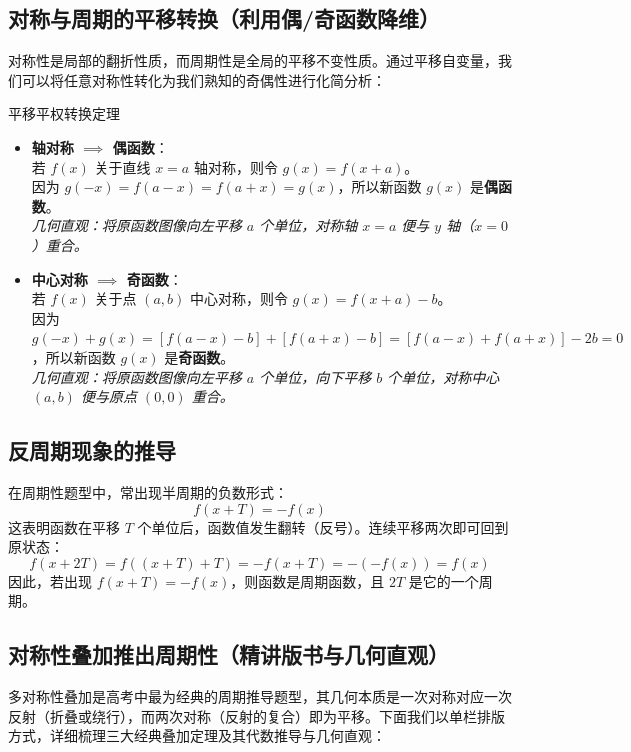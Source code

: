 \documentclass[11pt,a4paper]{ctexart}
\begin{document}
\subsection{对称与周期的平移转换（利用偶/奇函数降维）}

对称性是局部的翻折性质，而周期性是全局的平移不变性质。通过平移自变量，我们可以将任意对称性转化为我们熟知的奇偶性进行化简分析：

\begin{theorembox}{平移平权转换定理}
  \begin{itemize}
    \item \textbf{轴对称 $\implies$ 偶函数}：\\
          若 $f(x)$ 关于直线 $x = a$ 轴对称，则令 $g(x) = f(x+a)$。\\
          因为 $g(-x) = f(a-x) = f(a+x) = g(x)$，所以新函数 $g(x)$ 是\textbf{偶函数}。\\
          \textit{几何直观：将原函数图像向左平移 $a$ 个单位，对称轴 $x=a$ 便与 $y$ 轴（$x=0$）重合。}
    \item \textbf{中心对称 $\implies$ 奇函数}：\\
          若 $f(x)$ 关于点 $(a, b)$ 中心对称，则令 $g(x) = f(x+a) - b$。\\
          因为 $g(-x) + g(x) = [f(a-x) - b] + [f(a+x) - b] = [f(a-x) + f(a+x)] - 2b = 0$，所以新函数 $g(x)$ 是\textbf{奇函数}。\\
          \textit{几何直观：将原函数图像向左平移 $a$ 个单位，向下平移 $b$ 个单位，对称中心 $(a,b)$ 便与原点 $(0,0)$ 重合。}
  \end{itemize}
\end{theorembox}

\newpage
\subsection{反周期现象的推导}
在周期性题型中，常出现半周期的负数形式：
\[ f(x+T) = -f(x) \]
这表明函数在平移 $T$ 个单位后，函数值发生翻转（反号）。连续平移两次即可回到原状态：
\[ f(x+2T) = f((x+T)+T) = -f(x+T) = -(-f(x)) = f(x) \]
因此，若出现 $f(x+T) = -f(x)$，则函数是周期函数，且 $2T$ 是它的一个周期。

\subsection{对称性叠加推出周期性（精讲版书与几何直观）}

多对称性叠加是高考中最为经典的周期推导题型，其几何本质是一次对称对应一次反射（折叠或绕行），而两次对称（反射的复合）即为平移。下面我们以单栏排版方式，详细梳理三大经典叠加定理及其代数推导与几何直观：
\end{document}
